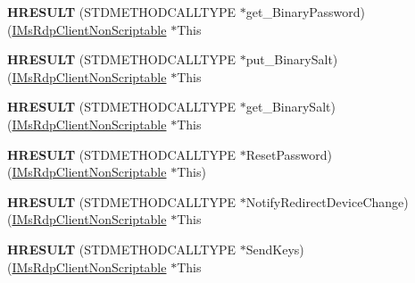 \begin{DoxyCompactItemize}
{\bfseries H\+R\+E\+S\+U\+LT} (S\+T\+D\+M\+E\+T\+H\+O\+D\+C\+A\+L\+L\+T\+Y\+PE $\ast$get\+\_\+\+Binary\+Password)(\hyperlink{interface_m_s_t_s_c_lib_1_1_i_ms_rdp_client_non_scriptable}{I\+Ms\+Rdp\+Client\+Non\+Scriptable} $\ast$This
\item 
\mbox{\label{struct_m_s_t_s_c_lib_1_1_i_ms_rdp_client_non_scriptable_vtbl_af81cdf9b17f867340cb2db35415cc111}} 
{\bfseries H\+R\+E\+S\+U\+LT} (S\+T\+D\+M\+E\+T\+H\+O\+D\+C\+A\+L\+L\+T\+Y\+PE $\ast$put\+\_\+\+Binary\+Salt)(\hyperlink{interface_m_s_t_s_c_lib_1_1_i_ms_rdp_client_non_scriptable}{I\+Ms\+Rdp\+Client\+Non\+Scriptable} $\ast$This
\item 
\mbox{\label{struct_m_s_t_s_c_lib_1_1_i_ms_rdp_client_non_scriptable_vtbl_ab6cf497d43aa4a666838a51b152aaaa4}} 
{\bfseries H\+R\+E\+S\+U\+LT} (S\+T\+D\+M\+E\+T\+H\+O\+D\+C\+A\+L\+L\+T\+Y\+PE $\ast$get\+\_\+\+Binary\+Salt)(\hyperlink{interface_m_s_t_s_c_lib_1_1_i_ms_rdp_client_non_scriptable}{I\+Ms\+Rdp\+Client\+Non\+Scriptable} $\ast$This
\item 
\mbox{\label{struct_m_s_t_s_c_lib_1_1_i_ms_rdp_client_non_scriptable_vtbl_adce6ec6a467bcda866d5e472397ab2e1}} 
{\bfseries H\+R\+E\+S\+U\+LT} (S\+T\+D\+M\+E\+T\+H\+O\+D\+C\+A\+L\+L\+T\+Y\+PE $\ast$Reset\+Password)(\hyperlink{interface_m_s_t_s_c_lib_1_1_i_ms_rdp_client_non_scriptable}{I\+Ms\+Rdp\+Client\+Non\+Scriptable} $\ast$This)
\item 
\mbox{\label{struct_m_s_t_s_c_lib_1_1_i_ms_rdp_client_non_scriptable_vtbl_ae1f46bf0ba6e874d2caafb5a7fa34870}} 
{\bfseries H\+R\+E\+S\+U\+LT} (S\+T\+D\+M\+E\+T\+H\+O\+D\+C\+A\+L\+L\+T\+Y\+PE $\ast$Notify\+Redirect\+Device\+Change)(\hyperlink{interface_m_s_t_s_c_lib_1_1_i_ms_rdp_client_non_scriptable}{I\+Ms\+Rdp\+Client\+Non\+Scriptable} $\ast$This
\item 
\mbox{\label{struct_m_s_t_s_c_lib_1_1_i_ms_rdp_client_non_scriptable_vtbl_a7d8d98f2a59cdacd3600a332eb64af1c}} 
{\bfseries H\+R\+E\+S\+U\+LT} (S\+T\+D\+M\+E\+T\+H\+O\+D\+C\+A\+L\+L\+T\+Y\+PE $\ast$Send\+Keys)(\hyperlink{interface_m_s_t_s_c_lib_1_1_i_ms_rdp_client_non_scriptable}{I\+Ms\+Rdp\+Client\+Non\+Scriptable} $\ast$This
\end{DoxyCompactItemize}
